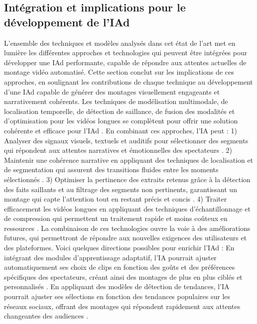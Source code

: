 \documentclass[livre]{udes-genie-these}
\begin{document}
\subsection{Intégration et implications pour le développement de l'IAd}
L'ensemble des techniques et modèles analysés dans cet état de l'art met en lumière les différentes approches et technologies qui peuvent être intégrées pour développer une IAd performante, capable de répondre aux attentes actuelles de montage vidéo automatisé. Cette section conclut sur les implications de ces approches, en soulignant les contributions de chaque technique au développement d'une IAd capable de générer des montages visuellement engageants et narrativement cohérents.
Les techniques de modélisation multimodale, de localisation temporelle, de détection de saillance, de fusion des modalités et d'optimisation pour les vidéos longues se complètent pour offrir une solution cohérente et efficace pour l'IAd \cite{zhou2024}\cite{li2024}\cite{huang2024_vtimellm}\cite{xu2024}\cite{weng2024}. En combinant ces approches, l'IA peut :
 1) Analyser des signaux visuels, textuels et auditifs pour sélectionner des segments qui répondent aux attentes narratives et émotionnelles des spectateurs \cite{chen2023}\cite{munasinghe2023_pgvideo}.
 2) Maintenir une cohérence narrative en appliquant des techniques de localisation et de segmentation qui assurent des transitions fluides entre les moments sélectionnés \cite{wang2024_hawkeye}\cite{guo2024_vtgllm}.
 3) Optimiser la pertinence des extraits retenus grâce à la détection des faits saillants et au filtrage des segments non pertinents, garantissant un montage qui capte l'attention tout en restant précis et concis \cite{you2023_ferret}\cite{han2024_clip}.
 4) Traiter efficacement les vidéos longues en appliquant des techniques d'échantillonnage et de compression qui permettent un traitement rapide et moins coûteux en ressources \cite{weng2024}\cite{lei2021_clipbert}.
La combinaison de ces technologies ouvre la voie à des améliorations futures, qui permettront de répondre aux nouvelles exigences des utilisateurs et des plateformes. Voici quelques directions possibles pour enrichir l'IAd :
En intégrant des modules d'apprentissage adaptatif, l'IA pourrait ajuster automatiquement ses choix de clips en fonction des goûts et des préférences spécifiques des spectateurs, créant ainsi des montages de plus en plus ciblés et personnalisés \cite{ghosh2019_excl}\cite{sun2023_gptsee}.
En appliquant des modèles de détection de tendances, l'IA pourrait ajuster ses sélections en fonction des tendances populaires sur les réseaux sociaux, offrant des montages qui répondent rapidement aux attentes changeantes des audiences \cite{descript2024}\cite{klap2024}.
\end{document}
